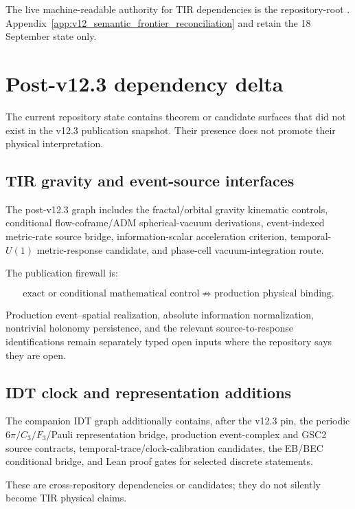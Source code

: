The live machine-readable authority for TIR dependencies is the repository-root
. Appendix~\ref{app:v12_semantic_frontier_reconciliation}
and  retain the 18 September state only.

\section{Post-v12.3 dependency delta}

The current repository state contains theorem or candidate surfaces that did not exist in
the v12.3 publication snapshot. Their presence does not promote their physical interpretation.

\subsection{TIR gravity and event-source interfaces}

The post-v12.3 graph includes the fractal/orbital gravity kinematic controls, conditional
flow-coframe/ADM spherical-vacuum derivations, event-indexed metric-rate source bridge,
information-scalar acceleration criterion, temporal-$U(1)$ metric-response candidate, and
phase-cell vacuum-integration route.

The publication firewall is:

\[
\boxed{
\text{exact or conditional mathematical control}
\not\Rightarrow
\text{production physical binding}.
}
\]

Production event--spatial realization, absolute information normalization, nontrivial
holonomy persistence, and the relevant source-to-response identifications remain separately
typed open inputs where the repository says they are open.

\subsection{IDT clock and representation additions}

The companion IDT graph additionally contains, after the v12.3 pin, the periodic
$6\pi/C_3/F_3$/Pauli representation bridge, production event-complex and GSC2 source
contracts, temporal-trace/clock-calibration candidates, the EB/BEC conditional bridge,
and Lean proof gates for selected discrete statements.

These are cross-repository dependencies or candidates; they do not silently become TIR
physical claims.

